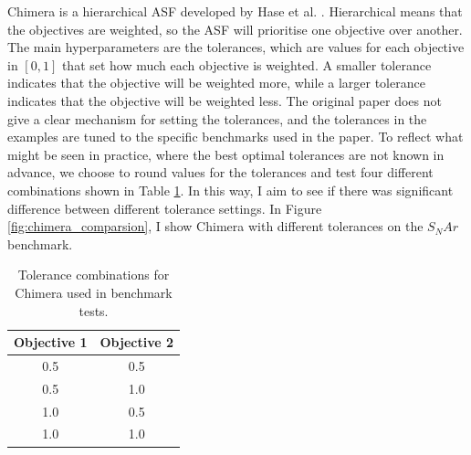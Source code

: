 Chimera is a hierarchical ASF developed by Hase et al. \cite{Hase2018b, Hase2020a}. Hierarchical means that the objectives are weighted, so the ASF will prioritise one objective over another. The main hyperparameters are the tolerances, which are values for each objective in $[0,1]$ that set how much each objective is weighted. A smaller tolerance indicates that the objective will be weighted more, while a larger tolerance indicates that the objective will be weighted less. The original paper does not give a clear mechanism for setting the tolerances, and the tolerances in the examples are tuned to the specific benchmarks used in the paper. To reflect what might be seen in practice, where the best optimal tolerances are not known in advance, we choose to round values for the tolerances and test four different combinations shown in Table \ref{tab:chimera_tolerances}. In this way, I aim to see if there was significant difference between different tolerance settings. In Figure \ref{fig:chimera_comparsion}, I show Chimera with different tolerances on the $S_NAr$ benchmark.


\begin{table}
    \centering
    \caption{Tolerance combinations for Chimera used in benchmark tests.}
    \begin{tabular}{cc}
         Objective 1 & Objective 2  \\
         \hline
         0.5 & 0.5 \\
         0.5 & 1.0 \\
         1.0 & 0.5 \\
         1.0 & 1.0 \\
    \end{tabular}
    \label{tab:chimera_tolerances}
\end{table}

